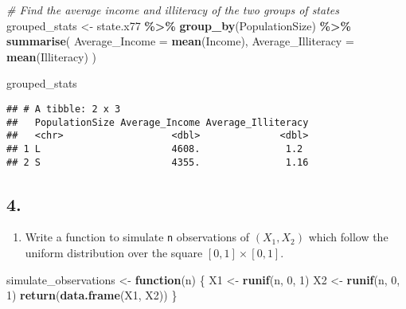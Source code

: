 \documentclass[
]{article}
\newenvironment{Shaded}{\begin{snugshade}}{\end{snugshade}}
\newcommand{\AttributeTok}[1]{\textcolor[rgb]{0.13,0.29,0.53}{#1}}
\newcommand{\CommentTok}[1]{\textcolor[rgb]{0.56,0.35,0.01}{\textit{#1}}}
\newcommand{\ControlFlowTok}[1]{\textcolor[rgb]{0.13,0.29,0.53}{\textbf{#1}}}
\newcommand{\DecValTok}[1]{\textcolor[rgb]{0.00,0.00,0.81}{#1}}
\newcommand{\FunctionTok}[1]{\textcolor[rgb]{0.13,0.29,0.53}{\textbf{#1}}}
\newcommand{\NormalTok}[1]{#1}
\newcommand{\OtherTok}[1]{\textcolor[rgb]{0.56,0.35,0.01}{#1}}
\newcommand{\SpecialCharTok}[1]{\textcolor[rgb]{0.81,0.36,0.00}{\textbf{#1}}}
\providecommand{\tightlist}{%
  \setlength{\itemsep}{0pt}\setlength{\parskip}{0pt}}
\begin{document}
\begin{Shaded}
\begin{Highlighting}[]
\CommentTok{\# Find the average income and illiteracy of the two groups of states}
\NormalTok{grouped\_stats }\OtherTok{\textless{}{-}}\NormalTok{ state.x77 }\SpecialCharTok{\%\textgreater{}\%} 
  \FunctionTok{group\_by}\NormalTok{(PopulationSize) }\SpecialCharTok{\%\textgreater{}\%} 
  \FunctionTok{summarise}\NormalTok{(}
    \AttributeTok{Average\_Income =} \FunctionTok{mean}\NormalTok{(Income),}
    \AttributeTok{Average\_Illiteracy =} \FunctionTok{mean}\NormalTok{(Illiteracy)}
\NormalTok{  )}

\NormalTok{grouped\_stats}
\end{Highlighting}
\end{Shaded}

\begin{verbatim}
## # A tibble: 2 x 3
##   PopulationSize Average_Income Average_Illiteracy
##   <chr>                   <dbl>              <dbl>
## 1 L                       4608.               1.2 
## 2 S                       4355.               1.16
\end{verbatim}

\subsection{4.}\label{section-3}

\begin{enumerate}
\def\labelenumi{\alph{enumi}.}
\tightlist
\item
  Write a function to simulate \texttt{n} observations of \((X_1, X_2)\)
  which follow the uniform distribution over the square
  \([0, 1] \times [0, 1]\).
\end{enumerate}

\begin{Shaded}
\begin{Highlighting}[]
\NormalTok{simulate\_observations }\OtherTok{\textless{}{-}} \ControlFlowTok{function}\NormalTok{(n) \{}
\NormalTok{  X1 }\OtherTok{\textless{}{-}} \FunctionTok{runif}\NormalTok{(n, }\DecValTok{0}\NormalTok{, }\DecValTok{1}\NormalTok{)}
\NormalTok{  X2 }\OtherTok{\textless{}{-}} \FunctionTok{runif}\NormalTok{(n, }\DecValTok{0}\NormalTok{, }\DecValTok{1}\NormalTok{)}
  \FunctionTok{return}\NormalTok{(}\FunctionTok{data.frame}\NormalTok{(X1, X2))}
\NormalTok{\}}
\end{Highlighting}
\end{Shaded}
\end{document}

